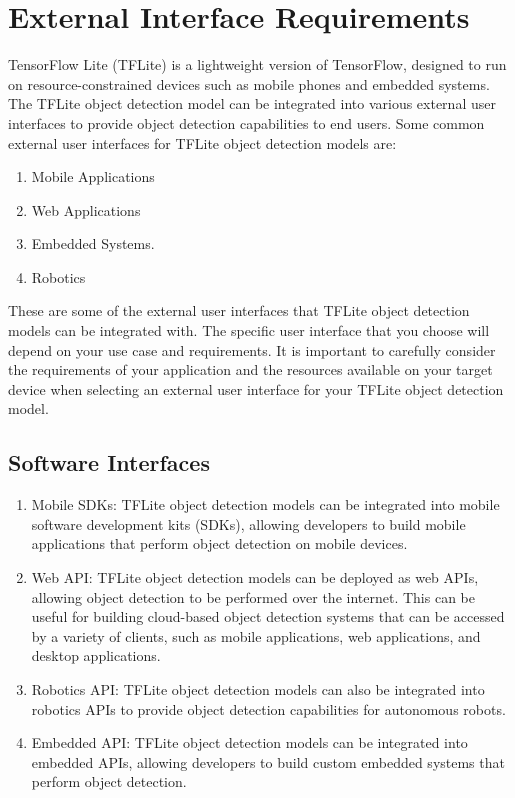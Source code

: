 	\section{External Interface Requirements}
	TensorFlow Lite (TFLite) is a lightweight version of TensorFlow, designed to run on resource-constrained devices such as mobile phones and embedded systems. The TFLite object detection model can be integrated into various external user interfaces to provide object detection capabilities to end users. Some common external user interfaces for TFLite object detection models are:
	\begin{enumerate}
		\item Mobile Applications
		\item Web Applications
		\item Embedded Systems.
		\item Robotics
	\end{enumerate}
These are some of the external user interfaces that TFLite object detection models can be integrated with. The specific user interface that you choose will depend on your use case and requirements. It is important to carefully consider the requirements of your application and the resources available on your target device when selecting an external user interface for your TFLite object detection model.

\subsection{Software Interfaces}
\begin{enumerate}
	\item Mobile SDKs: TFLite object detection models can be integrated into mobile software development kits (SDKs), allowing developers to build mobile applications that perform object detection on mobile devices.
	\item Web API: TFLite object detection models can be deployed as web APIs, allowing object detection to be performed over the internet. This can be useful for building cloud-based object detection systems that can be accessed by a variety of clients, such as mobile applications, web applications, and desktop applications.
	\item Robotics API: TFLite object detection models can also be integrated into robotics APIs to provide object detection capabilities for autonomous robots.
	\item Embedded API: TFLite object detection models can be integrated into embedded APIs, allowing developers to build custom embedded systems that perform object detection.
	 
\end{enumerate}


